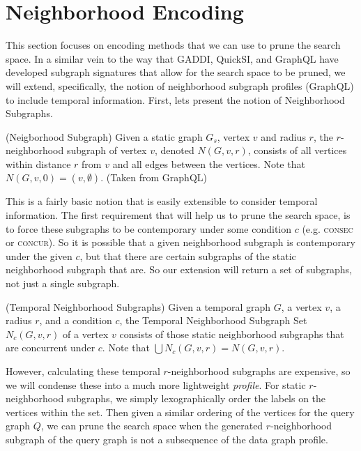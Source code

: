 \section{Neighborhood Encoding}

This section focuses on encoding methods that we can use to prune the search
space. In a similar vein to the way that GADDI, QuickSI, and GraphQL have
developed subgraph signatures that allow for the search space to be pruned, we
will extend, specifically, the notion of neighborhood subgraph profiles
(GraphQL) to include temporal information. First, lets present the notion of
Neighborhood Subgraphs.

\begin{defn}
  (Neigborhood Subgraph) Given a static graph $G_s$, vertex $v$ and radius $r$,
  the $r$-neighborhood subgraph of vertex $v$, denoted $N(G,v,r)$, consists of
  all vertices within distance $r$ from $v$ and all edges between the
  vertices. Note that $N(G,v,0) = ({v}, \emptyset)$. (Taken from GraphQL)
\end{defn}

This is a fairly basic notion that is easily extensible to consider temporal
information. The first requirement that will help us to prune the search space,
is to force these subgraphs to be contemporary under some condition $c$
(e.g. \textsc{consec} or \textsc{concur}). So it is possible that a given
neighborhood subgraph is contemporary under the given $c$, but that there are
certain subgraphs of the static neighborhood subgraph that are.  So our
extension will return a set of subgraphs, not just a single subgraph.

\begin{defn}
  (Temporal Neighborhood Subgraphs) Given a temporal graph $G$, a vertex $v$, a
  radius $r$, and a condition $c$, the Temporal Neighborhood Subgraph Set
  $N_c(G,v,r)$ of a vertex $v$ consists of those static neighborhood subgraphs
  that are concurrent under $c$. Note that $\displaystyle\bigcup N_c(G,v,r) =
  N(G,v,r)$.
\end{defn}

However, calculating these temporal $r$-neighborhood subgraphs are expensive, so we
will condense these into a much more lightweight \textit{profile}. For static
$r$-neighborhood subgraphs, we simply lexographically order the labels on the
vertices within the set. Then given a similar ordering of the vertices for the
query graph $Q$, we can prune the search space when the generated $r$-neighborhood
subgraph of the query graph is not a subsequence of the data graph profile.


